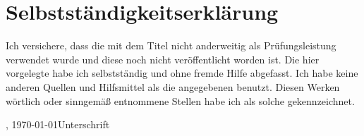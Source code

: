 
\chapter*{Selbstständigkeitserklärung}
\label{sec:eidesstatlicheErklaerung}

Ich versichere, dass die \thesis{} mit dem Titel \glqq{}\thesistitle \grqq{} nicht anderweitig als Prüfungsleistung verwendet wurde und diese \thesis{} noch nicht veröffentlicht worden ist. Die hier vorgelegte \thesis{} habe ich selbstständig und ohne fremde Hilfe abgefasst. Ich habe keine anderen Quellen und Hilfsmittel als die angegebenen benutzt. Diesen Werken wörtlich oder sinngemäß entnommene Stellen habe ich als solche gekennzeichnet.
\vfill

\begin{center}
\begin{minipage}{0.9\textwidth}
\place, \today \hfill  Unterschrift
\end{minipage}
\end{center}



